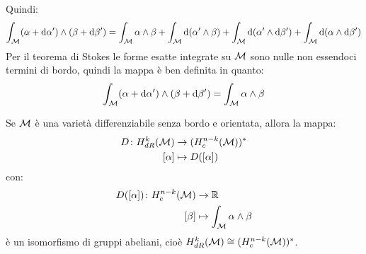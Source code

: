 Quindi:
\[
  \int_{\mathcal{M}} (\alpha + \operatorname{d}\!{\alpha}') \wedge (\beta + \operatorname{d}\!{\beta}') = \int_{\mathcal{M}} \alpha \wedge \beta + \int_{\mathcal{M}} \operatorname{d}\!{(\alpha' \wedge \beta)} + \int_{\mathcal{M}} \operatorname{d}\!{(\alpha' \wedge \operatorname{d}\!{\beta}')} + \int_{\mathcal{M}} \operatorname{d}\!{(\alpha \wedge \operatorname{d}\!{\beta}')}
\]
Per il teorema di Stokes le forme esatte integrate su $ \mathcal{M} $ sono nulle non essendoci termini di bordo,
quindi la mappa è ben definita in quanto:
\[
  \int_{\mathcal{M}} (\alpha + \operatorname{d}\!{\alpha}') \wedge (\beta + \operatorname{d}\!{\beta}') = \int_{\mathcal{M}} \alpha \wedge \beta
\]
\begin{theorem}
  Se $ \mathcal{M} $ è una varietà differenziabile senza bordo e orientata, allora la
  mappa:
  \begin{align*}
    D \colon H^k_{dR}(\mathcal{M}) & \to (H_c^{n-k}(\mathcal{M}))^* \\
    [\alpha] & \mapsto D([\alpha])
  \end{align*}
  con:
  \begin{align*}
    D([\alpha]) \colon H^{n-k}_c(\mathcal{M}) & \to \mathbb{R}^{} \\
    [\beta] & \mapsto \int_{\mathcal{M}} \alpha \wedge \beta
  \end{align*}
  è un isomorfismo di gruppi abeliani, cioè $ H^k_{dR}(\mathcal{M}) \cong (H^{n-k}_c(\mathcal{M}))^* $.
\end{theorem}
